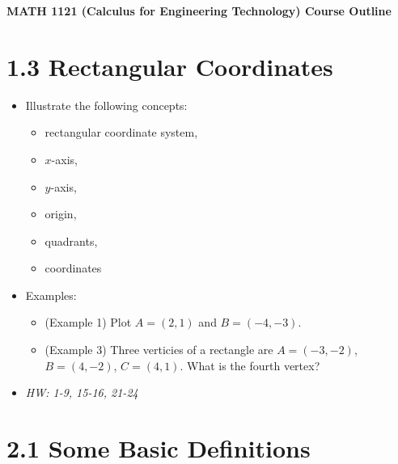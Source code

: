 \documentclass[11pt]{article}
\begin{document}
\noindent\textbf{
  MATH 1121 (Calculus for Engineering Technology) Course Outline
}

\section*{1.3 Rectangular Coordinates}

\begin{itemize}
\item Illustrate the following concepts:
  \begin{itemize}
    \item rectangular coordinate system,
    \item \(x\)-axis,
    \item \(y\)-axis,
    \item origin,
    \item quadrants,
    \item coordinates
  \end{itemize}

\item Examples:
  \begin{itemize}
    \item (Example 1) Plot \(A=(2,1)\) and \(B=(-4,-3)\).
    \item (Example 3) Three verticies of a rectangle are
          \(A=(-3,-2)\), \(B=(4,-2)\), \(C=(4,1)\). What is the
          fourth vertex?
  \end{itemize}

\item\textit{
  HW: 1-9, 15-16, 21-24
}
\end{itemize}

\section*{2.1 Some Basic Definitions}
\end{document}
